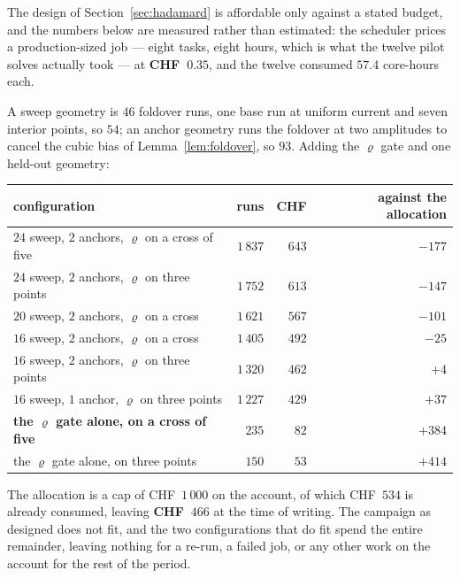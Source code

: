 \documentclass[11pt,a4paper]{article}
\theoremstyle{plain}
\theoremstyle{definition}
\theoremstyle{remark}
\begin{document}
The design of Section~\ref{sec:hadamard} is affordable only against a stated
budget, and the numbers below are measured rather than estimated: the scheduler
prices a production-sized job --- eight tasks, eight hours, which is what the
twelve pilot solves actually took --- at \textbf{CHF~$0.35$}, and the twelve
consumed $57.4$ core-hours each.

A sweep geometry is $46$ foldover runs, one base run at uniform current and
seven interior points, so $54$; an anchor geometry runs the foldover at two
amplitudes to cancel the cubic bias of Lemma~\ref{lem:foldover}, so $93$. Adding
the $\varrho$ gate and one held-out geometry:

\begin{center}
\small
\begin{tabular}{@{}lrrr@{}}
\toprule
configuration & runs & CHF & against the allocation \\
\midrule
$24$ sweep, $2$ anchors, $\varrho$ on a cross of five & $1\,837$ & $643$ & $-177$ \\
$24$ sweep, $2$ anchors, $\varrho$ on three points    & $1\,752$ & $613$ & $-147$ \\
$20$ sweep, $2$ anchors, $\varrho$ on a cross         & $1\,621$ & $567$ & $-101$ \\
$16$ sweep, $2$ anchors, $\varrho$ on a cross         & $1\,405$ & $492$ & $-25$ \\
$16$ sweep, $2$ anchors, $\varrho$ on three points    & $1\,320$ & $462$ & $+4$ \\
$16$ sweep, $1$ anchor,  $\varrho$ on three points    & $1\,227$ & $429$ & $+37$ \\
\midrule
\textbf{the $\varrho$ gate alone, on a cross of five} & $235$ & $82$ & $+384$ \\
the $\varrho$ gate alone, on three points             & $150$ & $53$ & $+414$ \\
\bottomrule
\end{tabular}
\end{center}

\noindent
The allocation is a cap of CHF~$1\,000$ on the account, of which CHF~$534$ is
already consumed, leaving \textbf{CHF~$466$} at the time of writing. The
campaign as designed does not fit, and the two configurations that do fit spend
the entire remainder, leaving nothing for a re-run, a failed job, or any other
work on the account for the rest of the period.
\end{document}
